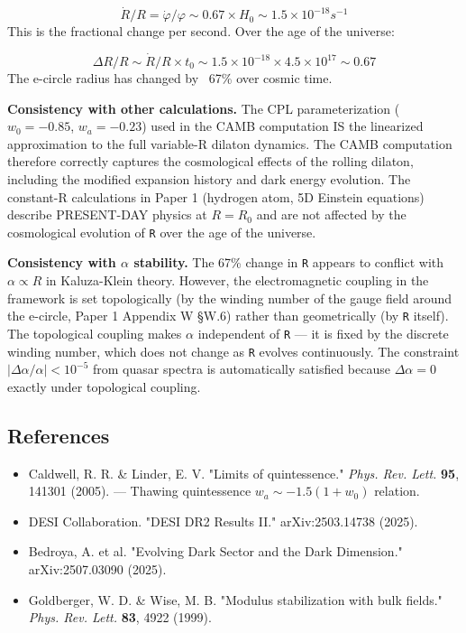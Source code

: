 \documentclass[aps,prd,preprint,superscriptaddress,longbibliography]{revtex4-2}
\begin{document}
\begin{equation}
    \dot{R}/R = \dot{\varphi}/\varphi \sim  0.67 \times H_{0} \sim  1.5 \times 10^{-18} s^{-1}
\end{equation}
This is the fractional change per second. Over the age of the universe:


\begin{equation}
    \Delta R/R \sim  \dot{R}/R \times t_{0} \sim  1.5 \times 10^{-18} \times 4.5 \times 10^{17} \sim  0.67
\end{equation}
The e-circle radius has changed by ~67\% over cosmic time.

\textbf{Consistency with other calculations.} The CPL parameterization ($w_{0} = -0.85$, $w_a = -0.23$) used in the CAMB computation IS the linearized approximation to the full variable-R dilaton dynamics. The CAMB computation therefore correctly captures the cosmological effects of the rolling dilaton, including the modified expansion history and dark energy evolution. The constant-R calculations in Paper 1 (hydrogen atom, 5D Einstein equations) describe PRESENT-DAY physics at $R = R_{0}$ and are not affected by the cosmological evolution of \texttt{R} over the age of the universe.

\textbf{Consistency with $\alpha$ stability.} The 67\% change in \texttt{R} appears to conflict with $\alpha \propto R$ in Kaluza-Klein theory. However, the electromagnetic coupling in the framework is set topologically (by the winding number of the gauge field around the e-circle, Paper 1 Appendix W \S{}W.6) rather than geometrically (by \texttt{R} itself). The topological coupling makes $\alpha$ independent of \texttt{R} --- it is fixed by the discrete winding number, which does not change as \texttt{R} evolves continuously. The constraint $|\Delta\alpha/\alpha| < 10^{-5}$ from quasar spectra is automatically satisfied because $\Delta\alpha = 0$ exactly under topological coupling.



\subsection{References}


\begin{itemize}
  \item Caldwell, R. R. \& Linder, E. V. "Limits of quintessence." \textit{Phys. Rev. Lett.} \textbf{95}, 141301 (2005). --- Thawing quintessence $w_a \sim  -1.5(1+w_{0})$ relation.
  \item DESI Collaboration. "DESI DR2 Results II." arXiv:2503.14738 (2025).
  \item Bedroya, A. et al. "Evolving Dark Sector and the Dark Dimension." arXiv:2507.03090 (2025).
  \item Goldberger, W. D. \& Wise, M. B. "Modulus stabilization with bulk fields." \textit{Phys. Rev. Lett.} \textbf{83}, 4922 (1999).
\end{itemize}
\end{document}
